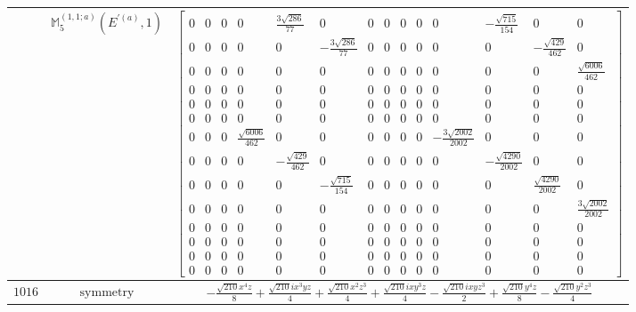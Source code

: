 \documentclass[fleqn,8pt,landscape]{jsarticle}
\begin{document}
\begin{longtable}{ccc}
$  $ & $ \mathbb{M}_{5}^{(1,1;a)}(E^{\prime(a)},1) $ & $ \begin{bmatrix} 0 & 0 & 0 & 0 & \frac{3 \sqrt{286}}{77} & 0 & 0 & 0 & 0 & 0 & 0 & - \frac{\sqrt{715}}{154} & 0 & 0 \\ 0 & 0 & 0 & 0 & 0 & - \frac{3 \sqrt{286}}{77} & 0 & 0 & 0 & 0 & 0 & 0 & - \frac{\sqrt{429}}{462} & 0 \\ 0 & 0 & 0 & 0 & 0 & 0 & 0 & 0 & 0 & 0 & 0 & 0 & 0 & \frac{\sqrt{6006}}{462} \\ 0 & 0 & 0 & 0 & 0 & 0 & 0 & 0 & 0 & 0 & 0 & 0 & 0 & 0 \\ 0 & 0 & 0 & 0 & 0 & 0 & 0 & 0 & 0 & 0 & 0 & 0 & 0 & 0 \\ 0 & 0 & 0 & 0 & 0 & 0 & 0 & 0 & 0 & 0 & 0 & 0 & 0 & 0 \\ 0 & 0 & 0 & \frac{\sqrt{6006}}{462} & 0 & 0 & 0 & 0 & 0 & 0 & - \frac{3 \sqrt{2002}}{2002} & 0 & 0 & 0 \\ 0 & 0 & 0 & 0 & - \frac{\sqrt{429}}{462} & 0 & 0 & 0 & 0 & 0 & 0 & - \frac{\sqrt{4290}}{2002} & 0 & 0 \\ 0 & 0 & 0 & 0 & 0 & - \frac{\sqrt{715}}{154} & 0 & 0 & 0 & 0 & 0 & 0 & \frac{\sqrt{4290}}{2002} & 0 \\ 0 & 0 & 0 & 0 & 0 & 0 & 0 & 0 & 0 & 0 & 0 & 0 & 0 & \frac{3 \sqrt{2002}}{2002} \\ 0 & 0 & 0 & 0 & 0 & 0 & 0 & 0 & 0 & 0 & 0 & 0 & 0 & 0 \\ 0 & 0 & 0 & 0 & 0 & 0 & 0 & 0 & 0 & 0 & 0 & 0 & 0 & 0 \\ 0 & 0 & 0 & 0 & 0 & 0 & 0 & 0 & 0 & 0 & 0 & 0 & 0 & 0 \\ 0 & 0 & 0 & 0 & 0 & 0 & 0 & 0 & 0 & 0 & 0 & 0 & 0 & 0 \end{bmatrix} $ \\ \hline
$ 1016 $ & $ \text{symmetry} $ & $ - \frac{\sqrt{210} x^{4} z}{8} + \frac{\sqrt{210} i x^{3} y z}{4} + \frac{\sqrt{210} x^{2} z^{3}}{4} + \frac{\sqrt{210} i x y^{3} z}{4} - \frac{\sqrt{210} i x y z^{3}}{2} + \frac{\sqrt{210} y^{4} z}{8} - \frac{\sqrt{210} y^{2} z^{3}}{4} $ \\

\end{longtable}
\end{document}
